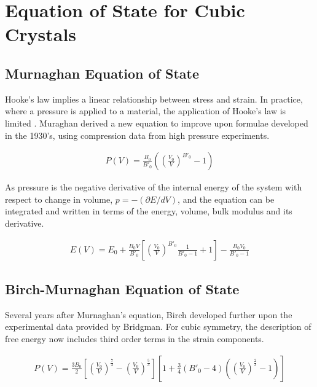 \documentclass[12pt,twoside]{manual}
\begin{document}
\section{Equation of State for Cubic Crystals}

\subsection{Murnaghan Equation of State}

Hooke's law implies a linear relationship between stress and strain.  In practice, where a pressure is applied to a material, the application of Hooke's law is limited \cite{murnaghaneq}.  Muraghan derived a new equation to improve upon formulae developed in the 1930's, using compression data from high pressure experiments.

\begin{equation}
\begin{split}
P(V) = \frac{B_0}{{B'}_0}\left(\left(\frac{V_0}{V}\right)^{{B'}_0}-1\right)
\end{split}
\label{eq:eqMurnachanEquationofStatePressure}
\end{equation}

As pressure is the negative derivative of the internal energy of the system with respect to change in volume, $p = -(\partial E/dV)$, and the equation can be integrated and written in terms of the energy, volume, bulk modulus and its derivative\cite{crystaleos}.

\begin{equation}
\begin{split}
E(V) = E_0 + \frac{B_0 V}{{B'}_0} \left[\left(\frac{V_0}{V}\right)^{{B'}_0} \frac{1}{{B'}_0 - 1} + 1 \right] - \frac{B_0 V_0}{{B'}_0-1}
\end{split}
\label{eq:eqMurnachanEquationofStateEnergy}
\end{equation}

\subsection{Birch-Murnaghan Equation of State}

Several years after Murnaghan's equation, Birch developed further upon the experimental data provided by Bridgman.  For cubic symmetry, the description of free energy now includes third order terms in the strain components\cite{birchmurnaghaneq}.

\begin{equation}
\begin{split}
P(V) = \frac{3 B_0}{2} \left[\left(\frac{V_0}{V}\right)^{\frac{7}{3}}-\left(\frac{V_0}{V}\right)^{\frac{5}{3}}\right] \left[1 + \frac{3}{4}({B'}_0-4)\left(\left(\frac{V_0}{V}\right)^{\frac{2}{3}}-1\right)\right]
\end{split}
\label{eq:eqMurnachan Equation of State}
\end{equation}
\end{document}
